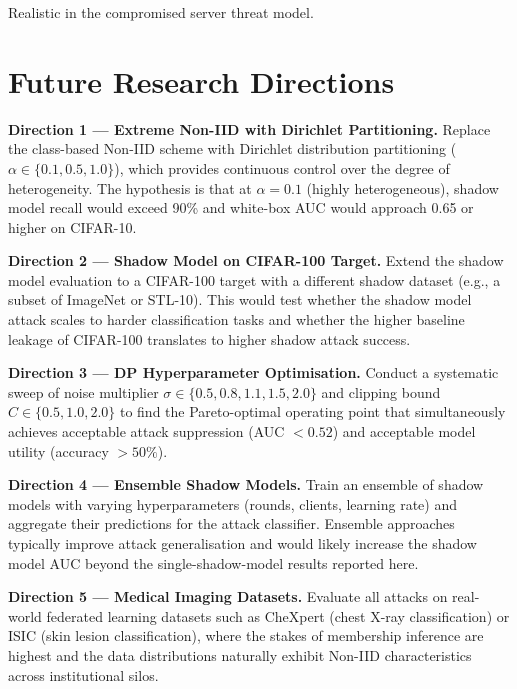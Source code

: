 \documentclass[12pt, a4paper]{report}
\begin{document}
\noindent *Realistic in the compromised server threat model.

\chapter{Future Research Directions}
\label{app:future}

\noindent\textbf{Direction 1 --- Extreme Non-IID with Dirichlet Partitioning.}
Replace the class-based Non-IID scheme with Dirichlet distribution partitioning
($\alpha \in \{0.1, 0.5, 1.0\}$), which provides continuous control over the
degree of heterogeneity. The hypothesis is that at $\alpha = 0.1$ (highly
heterogeneous), shadow model recall would exceed 90\% and white-box AUC would
approach 0.65 or higher on CIFAR-10.

\noindent\textbf{Direction 2 --- Shadow Model on CIFAR-100 Target.}
Extend the shadow model evaluation to a CIFAR-100 target with a different
shadow dataset (e.g., a subset of ImageNet or STL-10). This would test whether
the shadow model attack scales to harder classification tasks and whether the
higher baseline leakage of CIFAR-100 translates to higher shadow attack success.

\noindent\textbf{Direction 3 --- DP Hyperparameter Optimisation.}
Conduct a systematic sweep of noise multiplier $\sigma \in \{0.5, 0.8, 1.1,
1.5, 2.0\}$ and clipping bound $C \in \{0.5, 1.0, 2.0\}$ to find the
Pareto-optimal operating point that simultaneously achieves acceptable attack
suppression (AUC $< 0.52$) and acceptable model utility (accuracy $> 50\%$).

\noindent\textbf{Direction 4 --- Ensemble Shadow Models.}
Train an ensemble of shadow models with varying hyperparameters (rounds, clients,
learning rate) and aggregate their predictions for the attack classifier. Ensemble
approaches typically improve attack generalisation and would likely increase the
shadow model AUC beyond the single-shadow-model results reported here.

\noindent\textbf{Direction 5 --- Medical Imaging Datasets.}
Evaluate all attacks on real-world federated learning datasets such as CheXpert
(chest X-ray classification) or ISIC (skin lesion classification), where the
stakes of membership inference are highest and the data distributions naturally
exhibit Non-IID characteristics across institutional silos.

\clearpage
{}
{}
\listoffigures
\end{document}
